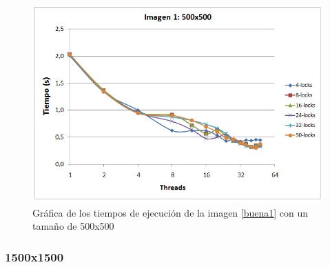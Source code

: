 \begin{figure}[H]
	\captionsetup{justification=centering}
	\centering
	\includegraphics[width=.7\textwidth]{./imagenes/graf1-500}
	\caption{Gr\'{a}fica de los tiempos de ejecuci\'{o}n de la imagen \ref{buena1} con un tama\~{n}o de 500x500}	
	\label{graf1-500}
\end{figure}

\subsubsection{1500x1500}


